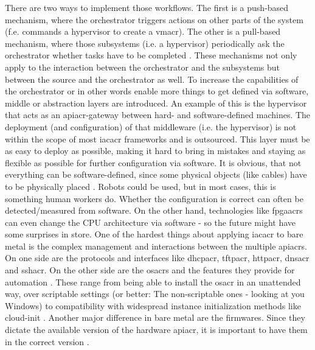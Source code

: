 \newline
There are two ways to implement those workflows. The first is a push-based mechanism, where the orchestrator triggers actions on other parts of the system (f.e. commands a hypervisor to create a \gls{vmacr}). The other is a pull-based mechanism, where those subsystems (i.e. a hypervisor) periodically ask the orchestrator whether tasks have to be completed \cite{infoworld_puppet_chef_ansible_salt}.
\newline
These mechanisms not only apply to the interaction between the orchestrator and the subsystems but between the source and the orchestrator as well.
\newline
To increase the capabilities of the orchestrator or in other words enable more things to get defined via software, middle or abstraction layers are introduced. An example of this is the hypervisor that acts as an \gls{apiacr}-gateway between hard- and software-defined machines. The deployment (and configuration) of that middleware (i.e. the hypervisor) is not within the scope of most \gls{iacacr} frameworks and is outsourced. This layer must be as easy to deploy as possible, making it hard to bring in mistakes and staying as flexible as possible for further configuration via software.
\newline
It is obvious, that not everything can be software-defined, since some physical objects (like cables) have to be physically placed \cite{iac_bare_metal}. Robots could be used, but in most cases, this is something human workers do. Whether the configuration is correct can often be detected/measured from software. On the other hand, technologies like \gls{fpgaacr}s can even change the CPU architecture via software - so the future might have some surprises in store.
\newline
One of the hardest things about applying \gls{iacacr} to bare metal is the complex management and interactions between the multiple \gls{apiacr}s. On one side are the  protocols and interfaces like \gls{dhcpacr}, \gls{tftpacr}, \gls{httpacr}, \gls{dnsacr} and \gls{sshacr}. On the other side are the \gls{osacr}s and the features they provide for automation \cite{iac_bare_metal}.
These range from being able to install the \gls{osacr} in an unattended way, over scriptable settings (or better: The non-scriptable ones - looking at you Windows) to compatibility with widespread instance initialization methods like cloud-init \cite{cloudinit_docs}.
\newline
Another major difference in bare metal are the firmwares. Since they dictate the available version of the hardware \gls{apiacr}, it is important to have them in the correct version \cite{iac_bare_metal}.

